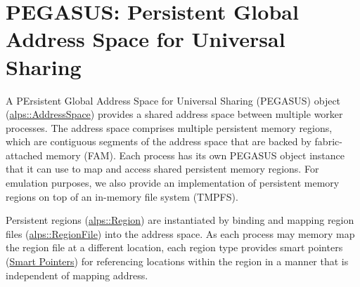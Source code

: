 \hypertarget{md__home_yuan_Benchmarks_whisper_mnemosyne-gcc_usermode_library_pmalloc_include_alps_src_pegasus_pegasus_pegasuspage}{}\section{P\+E\+G\+A\+S\+U\+S\+: Persistent Global Address Space for Universal Sharing       }\label{md__home_yuan_Benchmarks_whisper_mnemosyne-gcc_usermode_library_pmalloc_include_alps_src_pegasus_pegasus_pegasuspage}
A P\+Ersistent Global Address Space for Universal Sharing (P\+E\+G\+A\+S\+US) object (\hyperlink{classalps_1_1AddressSpace}{alps\+::\+Address\+Space}) provides a shared address space between multiple worker processes. The address space comprises multiple persistent memory regions, which are contiguous segments of the address space that are backed by fabric-\/attached memory (F\+AM). Each process has its own P\+E\+G\+A\+S\+US object instance that it can use to map and access shared persistent memory regions. For emulation purposes, we also provide an implementation of persistent memory regions on top of an in-\/memory file system (T\+M\+P\+FS).

Persistent regions (\hyperlink{classalps_1_1Region}{alps\+::\+Region}) are instantiated by binding and mapping region files (\hyperlink{classalps_1_1RegionFile}{alps\+::\+Region\+File}) into the address space. As each process may memory map the region file at a different location, each region type provides smart pointers (\hyperlink{group__SMARTPOINTERS}{Smart Pointers}) for referencing locations within the region in a manner that is independent of mapping address. 